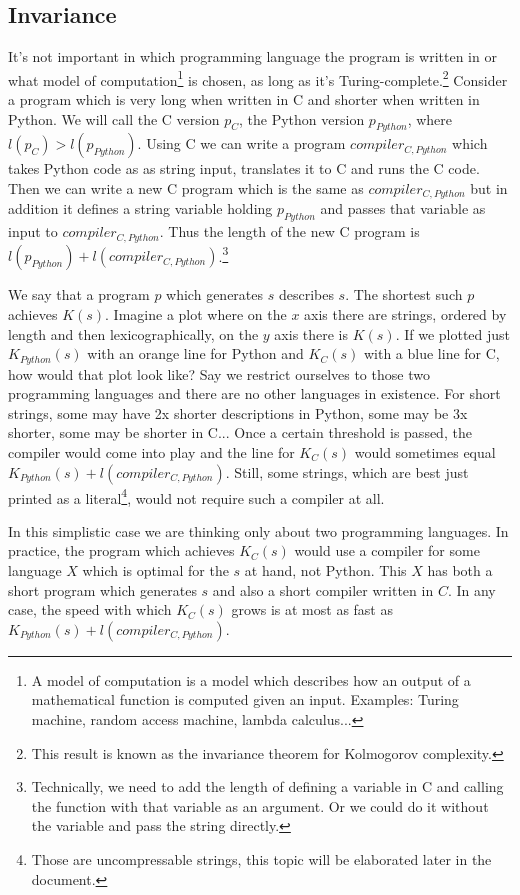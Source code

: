 \newpage

\subsection{Invariance}

It's not important in which programming language the program is written in or what model of computation\footnote{A model of computation is a model which describes how an output of a mathematical function is computed given an input. Examples: Turing machine, random access machine, lambda calculus...} is chosen, as long as it's Turing-complete.\footnote{This result is known as the invariance theorem for Kolmogorov complexity.}
Consider a program which is very long when written in C and shorter when written in Python.
We will call the C version $p_C$, the Python version $p_{Python}$, where $l(p_C) > l(p_{Python})$.
Using C we can write a program $compiler_{C,Python}$ which takes Python code as as string input, translates it to C and runs the C code.
Then we can write a new C program which is the same as $compiler_{C,Python}$ but in addition it defines a string variable holding $p_{Python}$ and passes that variable as input to $compiler_{C,Python}$.
Thus the length of the new C program is $l(p_{Python}) + l(compiler_{C,Python})$.\footnote{Technically, we need to add the length of defining a variable in C and calling the function with that variable as an argument. Or we could do it without the variable and pass the string directly.}

We say that a program $p$ which generates $s$ describes $s$.
The shortest such $p$ achieves $K(s)$.
Imagine a plot where on the $x$ axis there are strings, ordered by length and then lexicographically, on the $y$ axis there is $K(s)$.
If we plotted just $K_{Python}(s)$ with an orange line for Python and $K_C(s)$ with a blue line for C, how would that plot look like?
Say we restrict ourselves to those two programming languages and there are no other languages in existence.
For short strings, some may have 2x shorter descriptions in Python, some may be 3x shorter, some may be shorter in C...
Once a certain threshold is passed, the compiler would come into play and the line for $K_C(s)$ would sometimes equal $K_{Python}(s) + l(compiler_{C,Python})$.
Still, some strings, which are best just printed as a literal\footnote{Those are uncompressable strings, this topic will be elaborated later in the document.}, would not require such a compiler at all.

In this simplistic case we are thinking only about two programming languages.
In practice, the program which achieves $K_C(s)$ would use a compiler for some language $X$ which is optimal for the $s$ at hand, not Python. 
This $X$ has both a short program which generates $s$ and also a short compiler written in $C$.
In any case, the speed with which $K_C(s)$ grows is at most as fast as $K_{Python}(s) + l(compiler_{C,Python})$.

